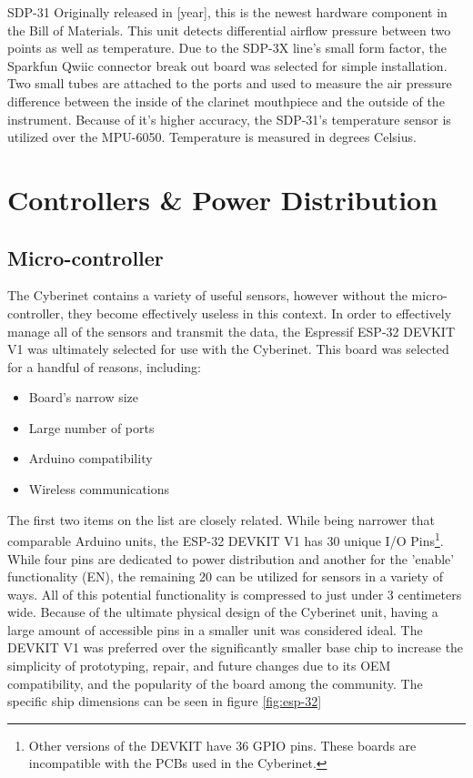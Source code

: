 SDP-31
Originally released in [year], this is the newest hardware component in the Bill of Materials. This unit detects differential airflow pressure between two points as well as temperature. Due to the SDP-3X line’s small form factor, the Sparkfun Qwiic connector break out board was selected for simple installation. Two small tubes are attached to the ports and used to measure the air pressure difference between the inside of the clarinet mouthpiece and the outside of the instrument.
Because of it’s higher accuracy, the SDP-31’s temperature sensor is utilized over the MPU-6050. Temperature is measured in degrees Celsius.



\section{Controllers \& Power Distribution}

\subsection{Micro-controller}
The Cyberinet contains a variety of useful sensors, however without the micro-controller, they become effectively useless in this context. In order to effectively manage all of the sensors and transmit the data, the Espressif ESP-32 DEVKIT V1 was ultimately selected for use with the Cyberinet. This board was selected for a handful of reasons, including:

\begin{itemize}
    \item Board's narrow size
    \item Large number of ports
    \item Arduino compatibility
    \item Wireless communications
\end{itemize}

The first two items on the list are closely related. While being narrower that comparable Arduino units, the ESP-32 DEVKIT V1 has 30 unique I/O Pins\footnote{Other versions of the DEVKIT have 36 GPIO pins. These boards are incompatible with the PCBs used in the Cyberinet.}. While four pins are dedicated to power distribution and another for the 'enable' functionality (EN), the remaining 20 can be utilized for sensors in a variety of ways. All of this potential functionality is compressed to just under 3 centimeters wide. Because of the ultimate physical design of the Cyberinet unit, having a large amount of accessible pins in a smaller unit was considered ideal. The DEVKIT V1 was preferred over the significantly smaller base chip to increase the simplicity of prototyping, repair, and future changes due to its OEM compatibility, and the popularity of the board among the community. The specific ship dimensions can be seen in figure \ref{fig:esp-32}

